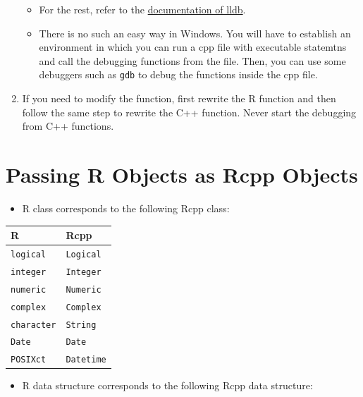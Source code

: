 \documentclass[
]{book}
\providecommand{\tightlist}{%
  \setlength{\itemsep}{0pt}\setlength{\parskip}{0pt}}
\begin{document}
\begin{enumerate}
  \begin{itemize}
  \tightlist
  \item
    For the rest, refer to the \href{https://lldb.llvm.org/}{documentation of lldb}.
  \item
    There is no such an easy way in Windows. You will have to establish an environment in which you can run a cpp file with executable statemtns and call the debugging functions from the file. Then, you can use some debuggers such as \texttt{gdb} to debug the functions inside the cpp file.
  \end{itemize}
\item
  If you need to modify the function, first rewrite the R function and then follow the same step to rewrite the C++ function. Never start the debugging from C++ functions.
\end{enumerate}

\hypertarget{passing-r-objects-as-rcpp-objects}{%
\section{Passing R Objects as Rcpp Objects}\label{passing-r-objects-as-rcpp-objects}}

\begin{itemize}
\tightlist
\item
  R class corresponds to the following Rcpp class:
\end{itemize}

\begin{longtable}[]{@{}ll@{}}
\toprule()
R & Rcpp \\
\midrule()
\endhead
\texttt{logical} & \texttt{Logical} \\
\texttt{integer} & \texttt{Integer} \\
\texttt{numeric} & \texttt{Numeric} \\
\texttt{complex} & \texttt{Complex} \\
\texttt{character} & \texttt{String} \\
\texttt{Date} & \texttt{Date} \\
\texttt{POSIXct} & \texttt{Datetime} \\
\bottomrule()
\end{longtable}

\begin{itemize}
\tightlist
\item
  R data structure corresponds to the following Rcpp data structure:
\end{itemize}
\end{document}
